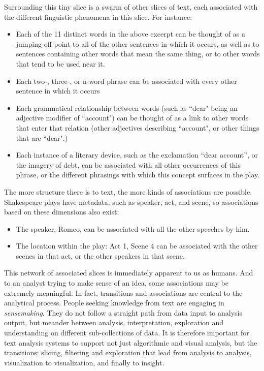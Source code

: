\documentclass{sig-alternate}
\begin{document}
Surrounding this tiny slice is a swarm of other slices of text, each associated with the different linguistic phenomena in this slice. For instance:
\begin{itemize}
\item Each of the 11 distinct words in the above excerpt can be thought of as a jumping-off point to all of the other sentences in which it occurs, as well as to sentences containing other words that mean the same thing, or to other words that tend to be used near it.
\item Each  two-, three-, or n-word phrase can be associated with every other sentence in which it occurs
\item  Each grammatical relationship between words (such as ``dear" being an adjective modifier of  ``account") can be thought of as a link to other words that enter that relation (other adjectives describing ``account", or other things that are ``dear".)
\item Each instance of a literary device, such as the exclamation ``dear account'', or the imagery of debt, can be associated with all other occurrences of this phrase, or the different phrasings with which this concept surfaces in the play.
\end{itemize}

The more structure there is to text, the more kinds of associations are possible. Shakespeare plays have metadata, such as speaker, act, and scene, so associations based on these dimensions also exist:
\begin{itemize}
\item The speaker, Romeo, can be associated with all the other speeches by him.
\item The location within the play: Act 1, Scene 4 can be associated with the other scenes in that act, or the other speakers in that scene.
\end{itemize}

This network of associated slices is immediately apparent to us as humans. And to an analyst trying to make sense of an idea, some associations may be extremely meaningful. In fact, transitions  and associations are central to the analytical process. People seeking knowledge from text are engaging in \emph{sensemaking}. They do not follow a straight path from data input to analysis output, but meander between analysis, interpretation, exploration and understanding on different sub-collections of data.  It is therefore important for text analysis systems to support not just algorithmic and visual analysis, but the transitions: slicing, filtering and exploration that lead from analysis to analysis, visualization to visualization, and finally to insight.
\end{document}
